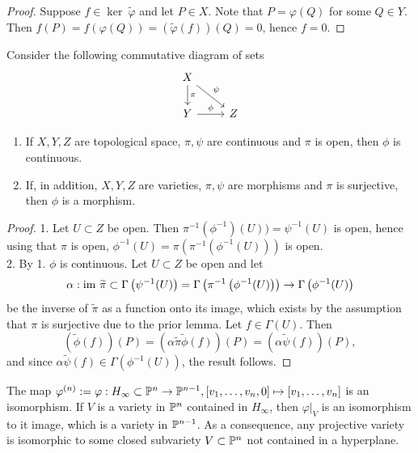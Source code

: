     \begin{proof}
        Suppose $f\in \ker\ \widetilde{\varphi}$ and let $P\in X$. Note that $P=\varphi(Q)$ for some $Q\in Y$. Then $f(P)=f(\varphi(Q))=(\widetilde{\varphi}(f))(Q)=0$, hence $f=0$.
    \end{proof}
    \begin{lemma}\label{DescentingMorphismToMorphismViaOpenSurjectiveMorphism}
        Consider the following commutative diagram of sets
        $$
            \begin{tikzcd}
                X \arrow[d, "\pi"] \arrow[rd, "\psi"] \\
                Y \arrow[r, "\phi"] & Z
            \end{tikzcd}
        $$
        \begin{enumerate}
            \item If $X,Y,Z$ are topological space, $\pi,\psi$ are continuous and $\pi$ is open, then $\phi$ is continuous.
            \item If, in addition, $X,Y,Z$ are varieties, $\pi,\psi$ are morphisms and $\pi$ is surjective, then $\phi$ is a morphism. 
        \end{enumerate}
    \end{lemma}
    \begin{proof}
        1. Let $U\subset Z$ be open. Then $\pi^{-1}(\phi^{-1})(U))=\psi^{-1}(U)$ is open, hence using that $\pi$ is open, $\phi^{-1}(U)= \pi(\pi^{-1}(\phi^{-1}(U)))$ is open.\\
        2. By 1. $\phi$ is continuous. Let $U\subset Z$ be open and let 
        $$\alpha: \im\ \widetilde{\pi}\subset \Gamma\left(\psi^{-1}(U)\right)=\Gamma\left(\pi^{-1}\left(\phi^{-1}(U)\right)\right)\rightarrow \Gamma\left(\phi^{-1}(U)\right)$$
        be the inverse of $\widetilde{\pi}$ as a function onto its image, which exists by the assumption that $\pi$ is surjective due to the prior lemma. Let $f\in \Gamma(U)$. Then 
        $$(\widetilde{\phi}(f))(P) = (\alpha\widetilde{\pi}\widetilde{\phi}(f))(P)= (\alpha\widetilde{\psi}(f))(P),$$
        and since $\alpha\widetilde{\psi}(f)\in \Gamma\left(\phi^{-1}(U)\right)$, the result follows. 
    \end{proof}
    \begin{lemma}\label{WeMayAssumeProjectiveVarietyNotContainedInHyperPlane}
        The map $\varphi^{(n)}:= \varphi: H_\infty \subset \mathbb{P}^n \rightarrow \mathbb{P}^{n-1}, [v_1,\dots,v_n,0]\mapsto [v_1,\dots,v_n]$ is an isomorphism. If $V$ is a variety in $\mathbb{P}^n$ contained in $H_\infty$, then $\left.\varphi\right|_{V}$ is an isomorphism to it image, which is a variety in $\mathbb{P}^{n-1}$. As a consequence, any projective variety is isomorphic to some closed subvariety $V\subset \mathbb{P}^n$ not contained in a hyperplane. 
    \end{lemma}
